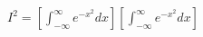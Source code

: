 \documentclass[preview]{standalone}
\begin{document}
\begin{align*}
I^2 =[ \int_{-\infty}^{\infty} e^{-x^2} dx ] [ \int_{-\infty}^{\infty} e^{-x^2} dx ]
\end{align*}
\end{document}
